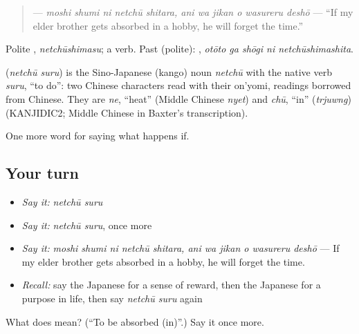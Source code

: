\begin{quote}
\textbf{    } — \emph{moshi shumi ni netchū shitara, ani wa jikan o wasureru deshō} — \textquotedblleft{}If my elder brother gets absorbed in a hobby, he will forget the time.\textquotedblright{}
\end{quote}

Polite \textbf{}, \emph{netchūshimasu}; a  verb. Past (polite): \textbf{  }, \emph{otōto ga shōgi ni netchūshimashita}.

\begin{cousinweb}
\textbf{} (\emph{netchū suru}) is the Sino-Japanese (kango) noun \emph{netchū} with the native verb \emph{suru}, \textquotedblleft{}to do\textquotedblright{}: two Chinese characters read with their on'yomi, readings borrowed from Chinese. They are \emph{ne}, \textquotedblleft{}heat\textquotedblright{} (Middle Chinese \emph{nyet}) and \emph{chū}, \textquotedblleft{}in\textquotedblright{} (\emph{trjuwng}) (KANJIDIC2; Middle Chinese in Baxter's transcription).
\end{cousinweb}

\begin{grammarlens}[title={What you've built}]
One more word for saying what happens if.
\end{grammarlens}

\subsection*{Your turn}
\begin{itemize}
\raggedright
  \item \emph{Say it:} \emph{netchū suru}
  \item \emph{Say it:} \emph{netchū suru}, once more
  \item \emph{Say it:} \emph{moshi shumi ni netchū shitara, ani wa jikan o wasureru deshō} — If my elder brother gets absorbed in a hobby, he will forget the time.
  \item \emph{Recall:} say the Japanese for a sense of reward, then the Japanese for a purpose in life, then say \emph{netchū suru} again
\end{itemize}

\begin{tcolorbox}[breakable,colback=teal!4,colframe=teal!35!black,title={Before you move on}]
What does  mean? (\textquotedblleft{}To be absorbed (in)\textquotedblright{}.) Say it once more.
\end{tcolorbox}
